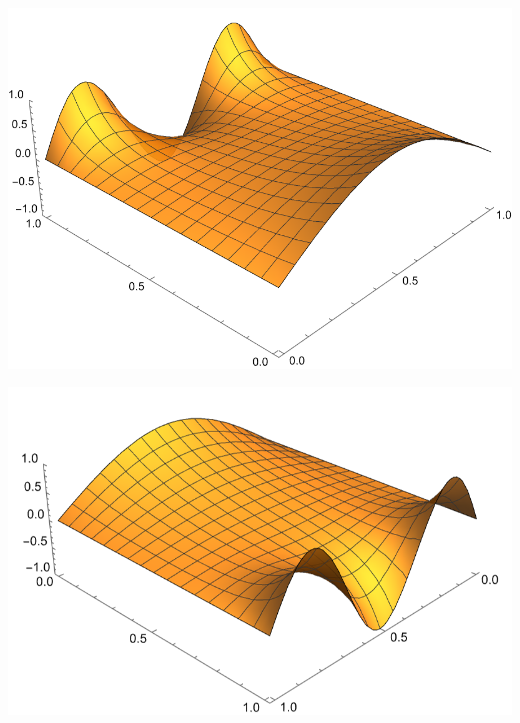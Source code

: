 \documentclass[10pt]{article}
\begin{document}
\begin{center}
    \begin{minipage}{0.49\linewidth}
        \includegraphics[width=\textwidth]{img/4_2.png}
    \end{minipage}
    \hfill
    \begin{minipage}{0.49\linewidth}
        \includegraphics[width=.96\textwidth]{img/4_1.png}
    \end{minipage}
\end{center}

\newpage


\section{\underline{}}
\label{sec: Problem 5}
\end{document}
